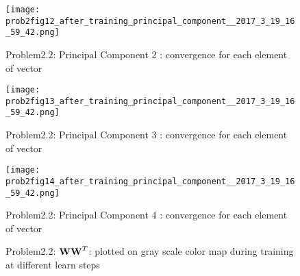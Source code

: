 \documentclass[epsfig]{article}
\begin{document}
\begin{figure}[h!]
\caption{Problem2.2: Principal Component 2 : convergence for each element of vector}
\texttt{[image: prob2fig12\_after\_training\_principal\_component\_\_2017\_3\_19\_16\_59\_42.png]}
\end{figure}

\begin{figure}[h!]
\caption{Problem2.2: Principal Component 3 : convergence for each element of vector}
\texttt{[image: prob2fig13\_after\_training\_principal\_component\_\_2017\_3\_19\_16\_59\_42.png]}
\end{figure}

\begin{figure}[h!]
\caption{Problem2.2: Principal Component 4 : convergence for each element of vector}
\texttt{[image: prob2fig14\_after\_training\_principal\_component\_\_2017\_3\_19\_16\_59\_42.png]}
\end{figure}


\begin{figure}
	\caption{Problem2.2: ${\bf W W}^T$: plotted on gray scale color map during training at different learn steps}
	\begin{subfigmatrix}{2}
	\end{subfigmatrix}
\end{figure}

%
%
%
%
%
%
%
%
\end{document}
